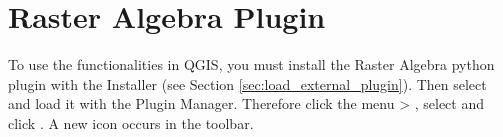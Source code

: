 
\section{Raster Algebra Plugin}\label{sec:ftools}

\updatedisclaimer




To use the functionalities in QGIS, you must install the Raster Algebra 
python plugin with the  Installer 
(see Section \ref{sec:load_external_plugin}). Then select and load it 
with the Plugin Manager. Therefore click the menu  > 
, select  and click 
. A new  icon occurs 
in the toolbar.

